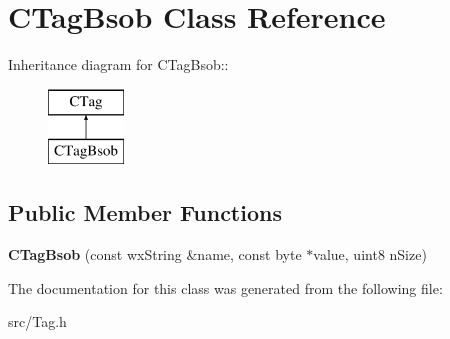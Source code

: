 \section{CTagBsob Class Reference}
\label{classCTagBsob}
Inheritance diagram for CTagBsob::\begin{figure}[H]
\begin{center}
\leavevmode
\includegraphics[height=2cm]{classCTagBsob}
\end{center}
\end{figure}
\subsection*{Public Member Functions}
\begin{DoxyCompactItemize}
\item 
{\bfseries CTagBsob} (const wxString \&name, const byte $\ast$value, uint8 nSize)\label{classCTagBsob_a587f06bececf2e3ee3547e9ea49c47fd}

\end{DoxyCompactItemize}


The documentation for this class was generated from the following file:\begin{DoxyCompactItemize}
\item 
src/Tag.h\end{DoxyCompactItemize}
